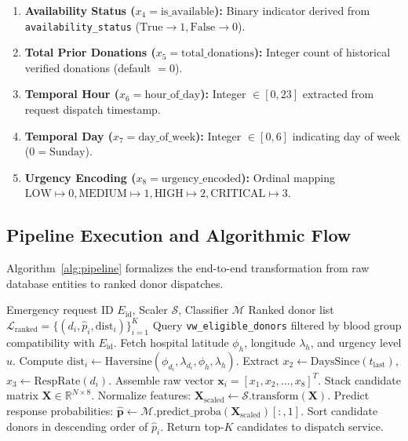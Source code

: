 \documentclass[conference]{IEEEtran}
\begin{document}
\begin{enumerate}
    \begin{equation}
        x_3 = \frac{\sum \mathbb{I}(\text{response} = \text{'YES'})}{N_{\text{notifications}}}, \quad \text{default} = 0.50
    \end{equation}
    \item \textbf{Availability Status ($x_4 = \text{is\_available}$):} Binary indicator derived from \texttt{availability\_status} ($\text{True} \to 1, \text{False} \to 0$).
    \item \textbf{Total Prior Donations ($x_5 = \text{total\_donations}$):} Integer count of historical verified donations (default $= 0$).
    \item \textbf{Temporal Hour ($x_6 = \text{hour\_of\_day}$):} Integer $\in [0, 23]$ extracted from request dispatch timestamp.
    \item \textbf{Temporal Day ($x_7 = \text{day\_of\_week}$):} Integer $\in [0, 6]$ indicating day of week ($0 = \text{Sunday}$).
    \item \textbf{Urgency Encoding ($x_8 = \text{urgency\_encoded}$):} Ordinal mapping $\text{LOW} \mapsto 0, \text{MEDIUM} \mapsto 1, \text{HIGH} \mapsto 2, \text{CRITICAL} \mapsto 3$.
\end{enumerate}

\subsection{Pipeline Execution and Algorithmic Flow}
Algorithm~\ref{alg:pipeline} formalizes the end-to-end transformation from raw database entities to ranked donor dispatches.

\begin{algorithm}[H]
\caption{End-to-End Database-to-Ranking Inference Pipeline}
\label{alg:pipeline}
\begin{algorithmic}[1]
\REQUIRE Emergency request ID $E_{\text{id}}$, Scaler $\mathcal{S}$, Classifier $\mathcal{M}$
\ENSURE Ranked donor list $\mathcal{L}_{\text{ranked}} = \{(d_i, \hat{p}_i, \text{dist}_i)\}_{i=1}^K$
\STATE Query \texttt{vw\_eligible\_donors} filtered by blood group compatibility with $E_{\text{id}}$.
\STATE Fetch hospital latitude $\phi_h$, longitude $\lambda_h$, and urgency level $u$.
    \STATE Compute $\text{dist}_i \leftarrow \text{Haversine}(\phi_{d_i}, \lambda_{d_i}, \phi_h, \lambda_h)$.
    \STATE Extract $x_2 \leftarrow \text{DaysSince}(t_{\text{last}})$, $x_3 \leftarrow \text{RespRate}(d_i)$.
    \STATE Assemble raw vector $\mathbf{x}_i = [x_1, x_2, \dots, x_8]^T$.
\ENDFOR
\STATE Stack candidate matrix $\mathbf{X} \in \mathbb{R}^{N \times 8}$.
\STATE Normalize features: $\mathbf{X}_{\text{scaled}} \leftarrow \mathcal{S}.\text{transform}(\mathbf{X})$.
\STATE Predict response probabilities: $\hat{\mathbf{p}} \leftarrow \mathcal{M}.\text{predict\_proba}(\mathbf{X}_{\text{scaled}})[:, 1]$.
\STATE Sort candidate donors in descending order of $\hat{p}_i$.
\STATE Return top-$K$ candidates to dispatch service.
\end{algorithmic}
\end{algorithm}
\end{document}
